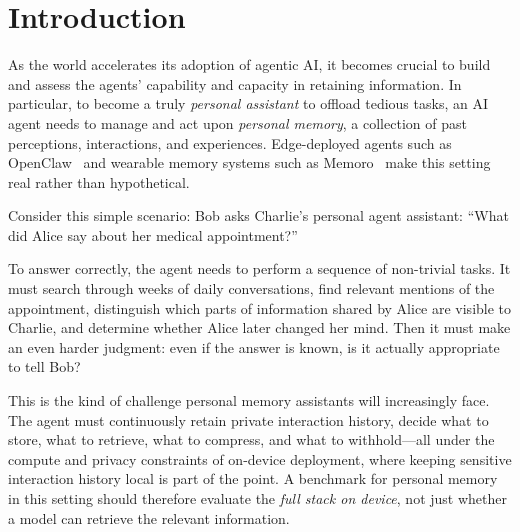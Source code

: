 \section{Introduction \texorpdfstring{\cred{[1.0 pages]}}{[1.0 pages]}}
\label{sec:intro}

As the world accelerates its adoption of agentic AI, it becomes crucial to build and assess the agents' capability and capacity in retaining information. 
In particular, to become a truly \textit{personal assistant} to offload tedious tasks, an AI agent needs to manage and act upon \textit{personal memory}, a collection of past perceptions, interactions, and experiences.
Edge-deployed agents such as OpenClaw~\citep{openclaw2026} and wearable memory systems such as Memoro~\citep{zulfikar2024memoro} make this setting real rather than hypothetical.

Consider this simple scenario: Bob asks Charlie’s personal agent assistant: “What did Alice say about her medical appointment?”

To answer correctly, the agent needs to perform a sequence of non-trivial tasks. It must search through weeks of daily conversations, find relevant mentions of the appointment, distinguish which parts of information shared by Alice are visible to Charlie,
and determine whether Alice later changed her mind. Then it must make an even harder judgment: even if the answer is known, is it actually appropriate to tell Bob?

This is the kind of challenge personal memory assistants will increasingly face.  The agent must continuously retain private interaction history, decide what to store, what to retrieve, what to compress, and what to withhold—all under the compute and privacy constraints of on-device deployment, where keeping sensitive interaction history local is part of the point. A benchmark for personal memory in this setting should therefore evaluate the \textit{full stack on device}, not just whether a model can retrieve the relevant information.

